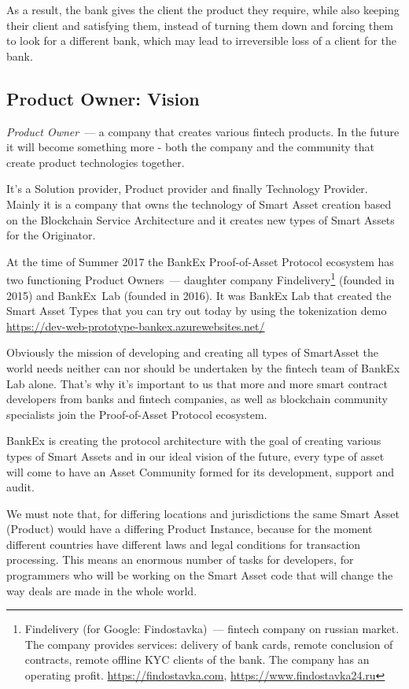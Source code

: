 \documentclass{article}
\begin{document}
\begin{multicols}{2}
As a result, the bank gives the client the product they require, while also keeping their client and satisfying them, instead of turning them down and forcing them to look for a different bank, which may lead to irreversible loss of a client for the bank.

\subsection{Product Owner: Vision}

\textit{Product Owner}~--- a company that creates various fintech products. In the future it will become something more - both the company and the community that create product technologies together.

It's a Solution provider, Product provider and finally Technology Provider. 
Mainly it is a company that owns the technology of Smart Asset creation based on the Blockchain Service Architecture and it creates new types of Smart Assets for the Originator.

At the time of Summer 2017 the BankEx Proof-of-Asset Protocol ecosystem has two functioning Product Owners~--- daughter company Findelivery\footnote{Findelivery (for Google: Findostavka)~--- fintech company on russian market. The company provides services: delivery of bank cards, remote conclusion of contracts, remote offline KYC clients of the bank. The company has an operating profit. \url{https://findostavka.com}, \url{https://www.findostavka24.ru}} (founded in 2015) and BankEx~Lab (founded in 2016). It was BankEx Lab that created the Smart Asset Types that you can try out today by using the tokenization demo \url{https://dev-web-prototype-bankex.azurewebsites.net/}

Obviously the mission of developing and creating all types of SmartAsset the world needs neither can nor should be undertaken by the fintech team of BankEx Lab alone. That’s why it’s important to us that more and more smart contract developers from banks and fintech companies, as well as blockchain community specialists join the Proof-of-Asset Protocol ecosystem.

BankEx is creating the protocol architecture with the goal of creating various types of Smart Assets and in our ideal vision of the future, every type of asset will come to have an Asset Community formed for its development, support and audit.

We must note that, for differing locations and jurisdictions the same Smart Asset (Product) would have a differing Product Instance, because for the moment different countries have different laws and legal conditions for transaction processing. This means an enormous number of tasks for developers, for programmers who will be working on the Smart Asset code that will change the way deals are made in the whole world.


\end{multicols}
\end{document}
